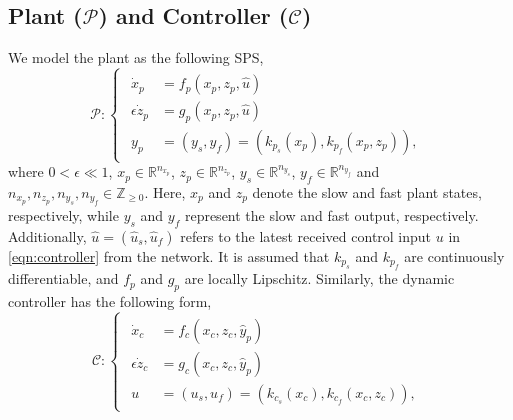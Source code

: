 \subsection{Plant ($\mathcal{P}$) and Controller ($\mathcal{C}$)}
We model the plant as the following SPS,
\begin{equation}
    \mathcal{P}:
    \begin{cases}
    \begin{aligned}
    \dot x_p &= f_p(x_p, z_p,\hat u)\\
    \epsilon \dot z_p &= g_p(x_p, z_p, \hat u) \\
    y_p &= \left(y_s, y_f  \right) = \left(k_{p_s}(x_p) , k_{p_f}(x_p, z_p) \right) ,
    \end{aligned}
    \end{cases} 
    \label{eqn:plant}
\end{equation}
where $0 < \epsilon \ll 1$, $x_p \in \mathbb{R}^{n_{x_p}}$, $z_p\in \mathbb{R}^{n_{z_p}}$, $y_s\in \mathbb{R}^{n_{y_s}}$, $y_f \in \mathbb{R}^{n_{y_f}}$ and $n_{x_p}, n_{z_p}, n_{y_s}, n_{y_f} \in \mathbb{Z}_{\geq 0}$.
%
Here, $x_p$ and $z_p$ denote the slow and fast plant states, respectively, while $y_s$ and $y_f$ represent the slow and fast output, respectively. Additionally, $\hat u = (\hat u_s, \hat u_f)$ refers to the latest received control input $u$ in \eqref{eqn:controller} from the network. It is assumed that $k_{p_s}$ and $k_{p_f}$ are continuously differentiable, and $f_p$ and $g_p$ are locally Lipschitz.
%
%
%
Similarly, the dynamic controller has the following form,
\begin{equation}
    \mathcal{C}:
    \begin{cases}
    \begin{aligned}
    \dot x_c &= f_c(x_c, z_c, \hat{y}_p)\\
    \epsilon \dot z_c &= g_c(x_c, z_c, \hat y_p) \\
    u &= (u_s, u_f) = \left(k_{c_s}(x_c), k_{c_f}(x_c,z_c) \right) ,
    \end{aligned}
    \end{cases}
    \label{eqn:controller}
\end{equation}
